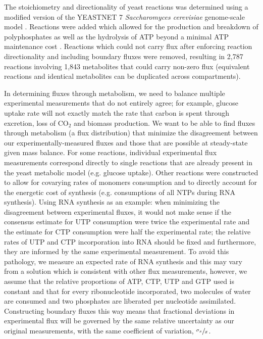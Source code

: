 The stoichiometry and directionality of yeast reactions was determined using a modified version of the YEASTNET 7 \textit{Saccharomyces cerevisiae} genome-scale model \cite{Herrgard:2008gb}.  Reactions were added which allowed for the production and breakdown of polyphosphates as well as the hydrolysis of ATP beyond a minimal ATP maintenance cost \cite{Famili:2003gl}.  Reactions which could not carry flux after enforcing reaction directionality and including boundary fluxes were removed, resulting in 2,787 reactions involving 1,843 metabolites that could carry non-zero flux (equivalent reactions and identical metabolites can be duplicated across compartments).

In determining fluxes through metabolism, we need to balance multiple experimental measurements that do not entirely agree; for example, glucose uptake rate will not exactly match the rate that carbon is spent through excretion, loss of CO$_{2}$ and biomass production. We want to be able to find fluxes through metabolism (a flux distribution) that minimize the disagreement between our experimentally-measured fluxes and those that are possible at steady-state given mass balance.  For some reactions, individual experimental flux measurements correspond directly to single reactions that are already present in the yeast metabolic model (e.g. glucose uptake). Other reactions were constructed to allow for covarying rates of monomers consumption and to directly account for the energetic cost of synthesis (e.g. consumptions of all NTPs during RNA synthesis).  Using RNA synthesis as an example: when minimizing the disagreement between experimental fluxes, it would not make sense if the consensus estimate for UTP consumption were twice the experimental rate and the estimate for CTP consumption were half the experimental rate; the relative rates of UTP and CTP incorporation into RNA should be fixed and furthermore, they are informed by the same experimental measurement.  To avoid this pathology, we measure an expected rate of RNA synthesis and this may vary from a solution which is consistent with other flux measurements, however, we assume that the relative proportions of ATP, CTP, UTP and GTP used is constant and that for every ribonucleotide incorporated, two molecules of water are consumed and two phosphates are liberated per nucleotide assimilated.  Constructing boundary fluxes this way means that fractional deviations in experimental flux will be governed by the same relative uncertainty as our original measurements, with the same coefficient of variation, $\sfrac{\sigma_{x}}{x}$.

